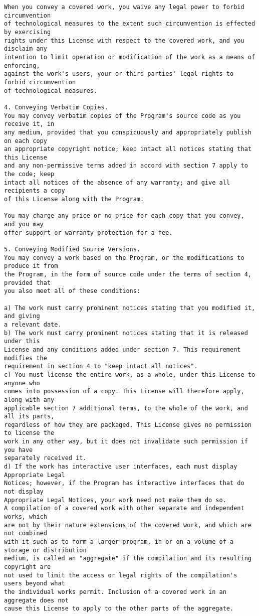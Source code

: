 \begin{verbatim}
When you convey a covered work, you waive any legal power to forbid circumvention
of technological measures to the extent such circumvention is effected by exercising
rights under this License with respect to the covered work, and you disclaim any
intention to limit operation or modification of the work as a means of enforcing,
against the work's users, your or third parties' legal rights to forbid circumvention
of technological measures.

4. Conveying Verbatim Copies.
You may convey verbatim copies of the Program's source code as you receive it, in
any medium, provided that you conspicuously and appropriately publish on each copy
an appropriate copyright notice; keep intact all notices stating that this License
and any non-permissive terms added in accord with section 7 apply to the code; keep
intact all notices of the absence of any warranty; and give all recipients a copy
of this License along with the Program.

You may charge any price or no price for each copy that you convey, and you may
offer support or warranty protection for a fee.

5. Conveying Modified Source Versions.
You may convey a work based on the Program, or the modifications to produce it from
the Program, in the form of source code under the terms of section 4, provided that
you also meet all of these conditions:

a) The work must carry prominent notices stating that you modified it, and giving
a relevant date.
b) The work must carry prominent notices stating that it is released under this
License and any conditions added under section 7. This requirement modifies the
requirement in section 4 to "keep intact all notices".
c) You must license the entire work, as a whole, under this License to anyone who
comes into possession of a copy. This License will therefore apply, along with any
applicable section 7 additional terms, to the whole of the work, and all its parts,
regardless of how they are packaged. This License gives no permission to license the
work in any other way, but it does not invalidate such permission if you have
separately received it.
d) If the work has interactive user interfaces, each must display Appropriate Legal
Notices; however, if the Program has interactive interfaces that do not display
Appropriate Legal Notices, your work need not make them do so.
A compilation of a covered work with other separate and independent works, which
are not by their nature extensions of the covered work, and which are not combined
with it such as to form a larger program, in or on a volume of a storage or distribution
medium, is called an "aggregate" if the compilation and its resulting copyright are
not used to limit the access or legal rights of the compilation's users beyond what
the individual works permit. Inclusion of a covered work in an aggregate does not
cause this License to apply to the other parts of the aggregate.


\end{verbatim}
